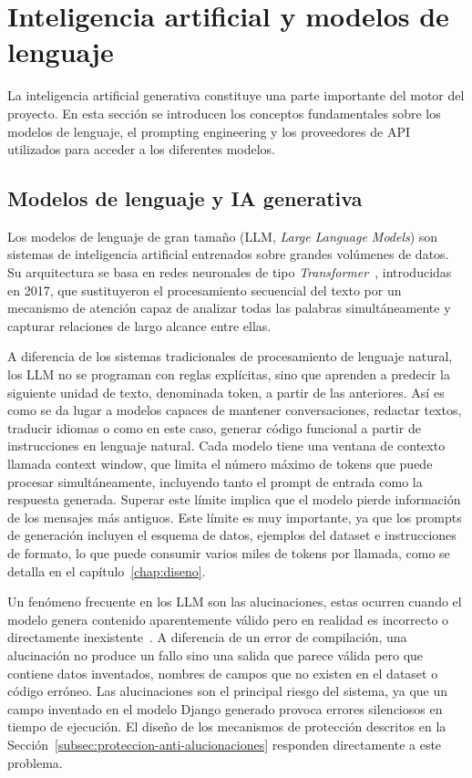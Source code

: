 \section{Inteligencia artificial y modelos de lenguaje}
\label{sec:ia}

La inteligencia artificial generativa constituye una parte importante del motor del proyecto. En esta sección se introducen los conceptos fundamentales sobre los modelos de lenguaje, el prompting engineering y los proveedores de API utilizados para acceder a los diferentes modelos.


\subsection{Modelos de lenguaje y IA generativa}
\label{subsec:llms}

Los modelos de lenguaje de gran tamaño (LLM, \emph{Large Language Models}) son sistemas de inteligencia artificial entrenados sobre grandes volúmenes de datos. Su arquitectura se basa en redes neuronales de tipo \emph{Transformer}~\cite{attention_is_all_you_need}, introducidas en 2017, que sustituyeron el procesamiento secuencial del texto por un mecanismo de atención capaz de analizar todas las palabras simultáneamente y capturar relaciones de largo alcance entre ellas.

A diferencia de los sistemas tradicionales de procesamiento de lenguaje natural, los LLM no se programan con reglas explícitas, sino que aprenden a predecir la siguiente unidad de texto, denominada token, a partir de las anteriores. Así es como se da lugar a modelos capaces de mantener conversaciones, redactar textos, traducir idiomas o como en este caso, generar código funcional a partir de instrucciones en lenguaje natural.
Cada modelo tiene una ventana de contexto llamada context window, que limita el número máximo de tokens que puede procesar simultáneamente, incluyendo tanto el prompt de entrada como la respuesta generada. Superar este límite implica que el modelo pierde información de los mensajes más antiguos. Este límite es muy importante, ya que los prompts de generación incluyen el esquema de datos, ejemplos del dataset e instrucciones de formato, lo que puede consumir varios miles de tokens por llamada, como se detalla en el capítulo~\ref{chap:diseno}.

Un fenómeno frecuente en los LLM son las alucinaciones, estas ocurren cuando el modelo genera contenido aparentemente válido pero en realidad es incorrecto o directamente inexistente~\cite{hallucination_survey}. A diferencia de un error de compilación, una alucinación no produce un fallo sino una salida que parece válida pero que contiene datos inventados, nombres de campos que no existen en el dataset o código erróneo. Las alucinaciones son el principal riesgo del sistema, ya que un campo inventado en el modelo Django generado provoca errores silenciosos en tiempo de ejecución. El diseño de los mecanismos de protección descritos en la Sección~\ref{subsec:proteccion-anti-alucionaciones} responden directamente a este problema.


